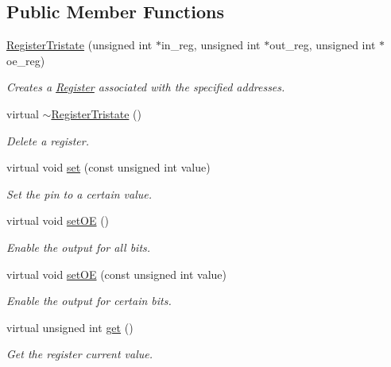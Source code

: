 \subsection*{Public Member Functions}
\begin{CompactItemize}
\item 
\hyperlink{classmprace_1_1RegisterTristate_a0}{Register\-Tristate} (unsigned int $\ast$in\_\-reg, unsigned int $\ast$out\_\-reg, unsigned int $\ast$oe\_\-reg)
\begin{CompactList}\small\item\em Creates a \hyperlink{classmprace_1_1Register}{Register} associated with the specified addresses. \item\end{CompactList}\item 
virtual \hyperlink{classmprace_1_1RegisterTristate_a1}{$\sim$Register\-Tristate} ()
\begin{CompactList}\small\item\em Delete a register. \item\end{CompactList}\item 
virtual void \hyperlink{classmprace_1_1RegisterTristate_a2}{set} (const unsigned int value)
\begin{CompactList}\small\item\em Set the pin to a certain value. \item\end{CompactList}\item 
virtual void \hyperlink{classmprace_1_1RegisterTristate_a3}{set\-OE} ()
\begin{CompactList}\small\item\em Enable the output for all bits. \item\end{CompactList}\item 
virtual void \hyperlink{classmprace_1_1RegisterTristate_a4}{set\-OE} (const unsigned int value)
\begin{CompactList}\small\item\em Enable the output for certain bits. \item\end{CompactList}\item 
virtual unsigned int \hyperlink{classmprace_1_1RegisterTristate_a5}{get} ()
\begin{CompactList}\small\item\em Get the register current value. \item\end{CompactList}\item 

\end{CompactItemize}
